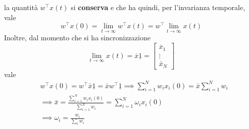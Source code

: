 la quantit\`a $w^\intercal x(t)$ si \textbf{conserva} e che ha quindi, per l'invarianza temporale, vale
\begin{equation}
    w^\intercal x(0) = \lim_{t \to \infty} w^\intercal x(t) = w^\intercal \lim_{t \to \infty} x(t)
\end{equation}
Inoltre, dal momento che si ha sincronizzazione
\begin{equation}
    \lim_{t \to \infty} x(t) = \overline{x}\underline{1} =  \begin{bmatrix}
        \overline{x}_1  \\ 
        \vdots \\
        \bar{x}_N
    \end{bmatrix}
\end{equation}
vale
\begin{equation}
    \begin{aligned}
    &w^\intercal x(0) = w^\intercal \bar{x}\underline{1} = \bar{x} w^\intercal \underline{1} \implies \sum_{i = 1}^{N} w_i x_i(0) = \bar{x} \sum_{i = 1}^{N} w_i \\
    &\implies \bar{x} = \frac{\sum_{i = 1}^{N} w_i x_i(0)}{\sum_{i = 1}^{N} w_i} = \sum_{i = 1}^{N} \omega_i x_i(0) \\
    &\implies \omega_i = \frac{w_i}{\sum_i w_i}
    \end{aligned}
\end{equation}

